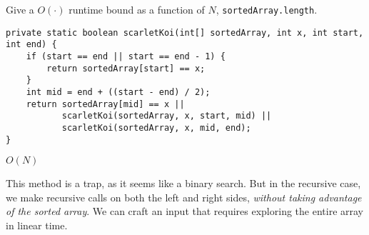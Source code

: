 \begin{blocksection}
\question Give a $O(\cdot)$ runtime bound as a function of $N$,
\lstinline$sortedArray.length$.
\begin{lstlisting}
private static boolean scarletKoi(int[] sortedArray, int x, int start, int end) {
    if (start == end || start == end - 1) {
        return sortedArray[start] == x;
    }
    int mid = end + ((start - end) / 2);
    return sortedArray[mid] == x ||
           scarletKoi(sortedArray, x, start, mid) ||
           scarletKoi(sortedArray, x, mid, end);
}
\end{lstlisting}

\begin{solution}
$O(N)$

This method is a trap, as it seems like a binary search. But in the recursive case, we make recursive calls on both the left and right sides, \textit{without taking advantage of the sorted array}. We can craft an input that requires exploring the entire array in linear time.
\end{solution}
\end{blocksection}
